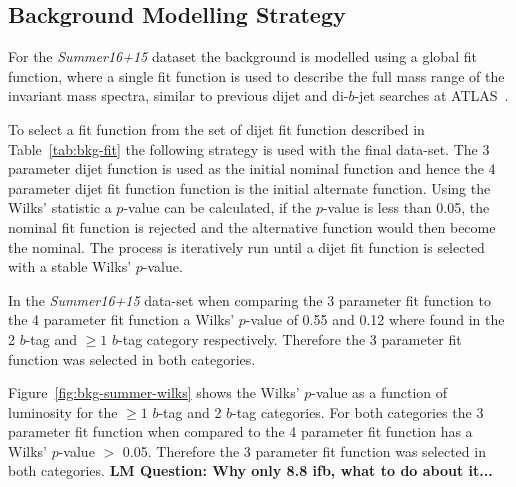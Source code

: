 \subsection{Background Modelling Strategy}
\label{sec:bkg-summer_global}

For the \textit{Summer16+15} dataset the background is modelled using a global fit function,
where a single fit function is used to describe the full mass range of the invariant mass spectra,
similar to previous dijet and di-$b$-jet searches at ATLAS~\cite{dijet-mori16_paper,dibjet-mori16_paper}.

To select a fit function from the set of dijet fit function described in Table~\ref{tab:bkg-fit} the following strategy is used with the final data-set.
The 3 parameter dijet function is used as the initial nominal function and hence the 4 parameter dijet fit function function is the initial alternate function.
Using the Wilks' statistic a $p$-value can be calculated,
if the $p$-value is less than 0.05, the nominal fit function is rejected and the alternative function would then become the nominal.
The process is iteratively run until a dijet fit function is selected with a stable Wilks' $p$-value.

In the \textit{Summer16+15} data-set when comparing the 3 parameter fit function to the 4 parameter fit function
a Wilks' $p$-value of 0.55 and 0.12 where found in the 2 $b$-tag and $\geq1$ $b$-tag category respectively.
Therefore the 3 parameter fit function was selected in both categories.

Figure~\ref{fig:bkg-summer-wilks} shows the Wilks' $p$-value as a function of luminosity
for the $\geq1$ $b$-tag and 2 $b$-tag categories.
For both categories the 3 parameter fit function when compared to the 4 parameter fit function
has a Wilks' $p$-value $>$ 0.05.
Therefore the 3 parameter fit function was selected in both categories.
\textbf{LM Question: Why only 8.8 ifb, what to do about it...}

